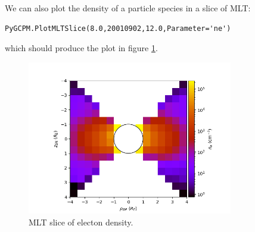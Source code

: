 			We can also plot the density of a particle species in a slice of MLT:
			\begin{verbatim}
PyGCPM.PlotMLTSlice(8.0,20010902,12.0,Parameter='ne')
			\end{verbatim}
			which should produce the plot in figure \ref{FigPyGCPMMLT}.

			\begin{figure}
				\begin{center}
					\includegraphics[width=0.8\textwidth]{figures/ch2_pygcpm_mlt.png}
				\end{center}
				\caption{MLT slice of electon density. \label{FigPyGCPMMLT}}
			\end{figure}
